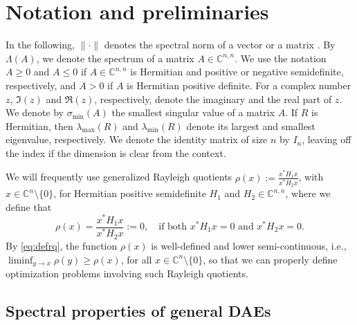 \documentclass[11pt]{article}
\newcommand{\C}{\mathbb C}
\begin{document}
\section{Notation and preliminaries}\label{sec:prelim}
In the following, $\|\cdot\|$ denotes the spectral norm of a vector or a matrix%
. By $\Lambda(A)$, we denote the spectrum of a matrix $A \in \C^{n,n}$. %
We use the notation $A \geq 0$ and $A \leq 0$ if $A \in \C^{n,n}$ is Hermitian and positive or  negative semidefinite, respectively, and $A > 0$ if $A$ is Hermitian positive definite.
 For a complex number $z$, $\Im(z)$ and $\Re(z)$, respectively, denote the imaginary and the real part of $z$. We denote by $\sigma_{\text{min}}(A)$  the smallest singular value of a matrix $A$. If $R$ is Hermitian, then $\lambda_{\text{max}}(R)$ and $\lambda_{\text{min}}(R)$ denote its largest and smallest eigenvalue, respectively.
We denote the identity matrix of size $n$ by $I_n$, leaving off the index if the dimension is clear from the context.

We will frequently use generalized Rayleigh quotients $\rho(x) := \frac{x^*H_1x}{x^*H_2x}$, with $x\in\C^n\setminus\{0\}$, for Hermitian positive semidefinite $H_1$ and $H_2\in\C^{n,n}$,
where we define that
%
\begin{equation}\label{eq:defrq}
	\rho(x)= \frac{x^*H_1x}{x^*H_2x} :=0, \quad\text{if both $x^*H_1x = 0$ and $x^*H_2x= 0$.}
\end{equation}
%
By \eqref{eq:defrq}, the function $\rho(x)$ is well-defined and lower semi-continuous, i.e., $\liminf_{y\to x}\rho(y)\geq \rho(x)$, for all $x\in\C^n\setminus\{0\}$, so that we can properly define optimization problems involving such Rayleigh quotients.

\subsection{Spectral properties of general DAEs}\label{sec:gendae}
\end{document}
